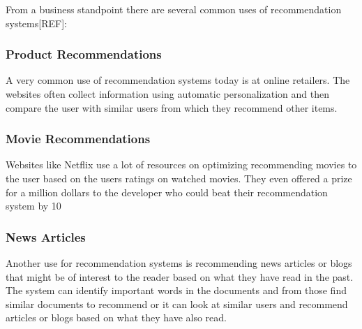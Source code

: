 From a business standpoint there are several common uses of recommendation systems[REF]:

\subsubsection{Product Recommendations}


A very common use of recommendation systems today is at online retailers. The websites often collect information using automatic personalization and then compare the user with similar users from which they recommend other items.


\subsubsection{Movie Recommendations}


Websites like Netflix use a lot of resources on optimizing recommending movies to the user based on the users ratings on watched movies. They even offered a prize for a million dollars to the developer who could beat their recommendation system by 10%


\subsubsection{News Articles}


Another use for recommendation systems is recommending news articles or blogs that might be of interest to the reader based on what they have read in the past. The system can identify important words in the documents and from those find similar documents to recommend or it can look at similar users and recommend articles or blogs based on what they have also read.    
